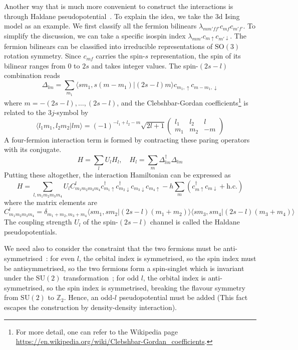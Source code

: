 \documentclass{timesjhep}
\begin{document}
Another way that is much more convenient to construct the interactions is through Haldane pseudopotential~\cite{Haldane1983LLL,Trugman1985Pseudo}. To explain the idea, we take the 3d Ising model as an example. We first classify all the fermion bilinears $\lambda_{mm'ff'}c_{mf}c_{m'f'}$. To simplify the discussion, we can take a specific isospin index $\lambda_{mm'}c_{m\uparrow}c_{m'\downarrow}$. The fermion bilinears can be classified into irreducible representations of $\mathrm{SO}(3)$ rotation symmetry. Since $c_{mf}$ carries the spin-$s$ representation, the spin of its bilinear ranges from $0$ to $2s$ and takes integer values. The spin-$(2s-l)$ combination reads 
\begin{equation}
    \Delta_{lm}=\sum_{m_1}\langle sm_1,s(m-m_1)|(2s-l)m\rangle c_{m_1,\uparrow}c_{m-m_1,\downarrow}
\end{equation} 
where $m=-(2s-l),\dots,(2s-l)$, and the Clebshbar-Gordan coefficients\footnote{For more detail, one can refer to the Wikipedia page \url{https://en.wikipedia.org/wiki/Clebshbar-Gordan_coefficients}.} is related to the $3j$-symbol by
\begin{equation}
    \langle l_1m_1,l_2m_2|lm\rangle=(-1)^{-l_1+l_2-m}\sqrt{2l+1}\begin{pmatrix}l_1&l_2&l\\m_1&m_2&-m\end{pmatrix}
\end{equation}
A four-fermion interaction term is formed by contracting these paring operators with its conjugate. 
\begin{equation}
    H=\sum_lU_lH_l,\quad H_l=\sum_m\Delta_{lm}^\dagger\Delta_{lm} 
\end{equation} 
Putting these altogether, the interaction Hamiltonian can be expressed as 
\begin{equation}
    H=\sum_{l,m_1m_2m_3m_4}U_lC^l_{m_1m_2m_3m_4}c^\dagger_{m_1\uparrow}c^\dagger_{m_2\downarrow}c_{m_3\downarrow}c_{m_4\uparrow}-h\sum_m(c_{m\uparrow}^\dagger c_{m\downarrow}+\mathrm{h.c.}) 
\end{equation}
where the matrix elements are 
\begin{equation}
    C^l_{m_1m_2m_3m_4}=\delta_{m_1+m_2,m_3+m_4}\langle sm_1,sm_2|(2s-l)(m_1+m_2)\rangle\langle sm_3,sm_4|(2s-l)(m_3+m_4)\rangle 
    \label{eq:ps_pot_coeff}
\end{equation} 
The coupling strength $U_l$ of the spin-$(2s-l)$ channel is called the Haldane pseudopotentials. 

We need also to consider the constraint that the two fermions must be anti-symmetrised~: for even $l$, the orbital index is symmetrised, so the spin index must be antisymmetrised, so the two fermions form a spin-singlet which is invariant under the $\mathrm{SU}(2)$ transformation~; for odd $l$, the orbital index is anti-symmetrised, so the spin index is symmetrised, breaking the flavour symmetry from $\mathrm{SU}(2)$ to $\mathbb{Z}_2$. Hence, an odd-$l$ pseudopotential must be added (This fact escapes the construction by density-density interaction). 
\end{document}
